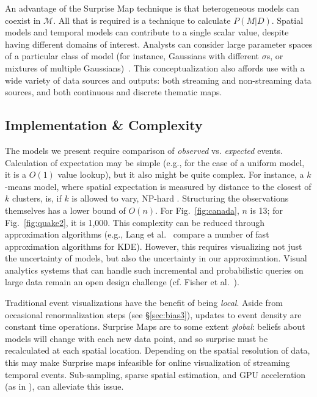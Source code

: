 \documentclass[journal]{vgtc}                %
\begin{document}
An advantage of the Surprise Map technique is that heterogeneous models can coexist in $\mathcal{M}$. All that is required is a technique to calculate $P(M|D)$. Spatial models and temporal models can contribute to a single scalar value, despite having different domains of interest. Analysts can consider large parameter spaces of a particular class of model (for instance, Gaussians with different $\sigma$s, or mixtures of multiple Gaussians)~\cite{baldi2010bits}. This conceptualization also affords use with a wide variety of data sources and outputs: both streaming and non-streaming data sources, and both continuous and discrete thematic maps.

\subsection{Implementation \& Complexity}
\label{sec:complexity}

The models we present require comparison of \emph{observed} vs. \emph{expected} events. Calculation of expectation may be simple (e.g., for the case of a uniform model, it is a $O(1)$ value lookup), but it also might be quite complex. For instance, a $k$-means model, where spatial expectation is measured by distance to the closest of $k$ clusters, is, if $k$ is allowed to vary, NP-hard \cite{mahajan2009planar}. Structuring the observations themselves has a lower bound of $O(n)$. For Fig.~\ref{fig:canada}, $n$ is 13; for Fig.~\ref{fig:quake2}, it is 1,000. This complexity can be reduced through approximation algorithms (e.g., Lang et al.~\cite{lang2005empirical} compare a number of fast approximation algorithms for KDE). However, this requires visualizing not just the uncertainty of models, but also the uncertainty in our approximation. Visual analytics systems that can handle such incremental and probabilistic queries on large data remain an open design challenge (cf. Fisher et al.~\cite{fisher2012trust}).

Traditional event visualizations have the benefit of being \emph{local}. Aside from occasional renormalization steps (see \S\ref{sec:bias3}), updates to event density are constant time operations. Surprise Maps are to some extent \emph{global}: beliefs about models will change with each new data point, and so surprise must be recalculated at each spatial location. Depending on the spatial resolution of data, this may make Surprise maps infeasible for online visualization of streaming temporal events. Sub-sampling, sparse spatial estimation, and GPU acceleration (as in \cite{SG15}), can alleviate this issue.
\end{document}
